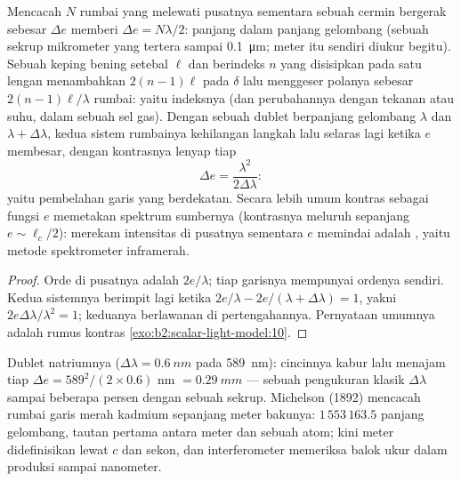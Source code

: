 \begin{proposition}\label{prop:b2:michelson:measure}
Mencacah $N$ rumbai yang melewati pusatnya sementara sebuah cermin bergerak sebesar $\Delta e$
memberi $\Delta e = N\lambda/2$: panjang dalam panjang gelombang (sebuah sekrup mikrometer
yang tertera sampai \qty{0.1}{\micro m}; meter itu sendiri diukur begitu). Sebuah
keping bening setebal $\ell$ dan berindeks $n$ yang disisipkan pada satu lengan
menambahkan $2(n - 1)\ell$ pada $\delta$ lalu menggeser polanya sebesar $2(n - 1)\ell/\lambda$
rumbai: yaitu indeksnya (dan perubahannya dengan tekanan atau suhu,
dalam sebuah sel gas). Dengan sebuah dublet berpanjang gelombang $\lambda$ dan $\lambda + \Delta\lambda$, kedua
sistem rumbainya kehilangan langkah lalu selaras lagi ketika $e$ membesar, dengan
kontrasnya lenyap tiap
\[
\Delta e = \frac{\lambda^2}{2\Delta\lambda} :
\]
yaitu pembelahan garis yang berdekatan. Secara lebih umum kontras sebagai
fungsi $e$ memetakan spektrum sumbernya (kontrasnya
meluruh sepanjang $e \sim \ell_c/2$): merekam intensitas di pusatnya sementara
$e$ memindai adalah \emph{}, yaitu metode
spektrometer inframerah.
\end{proposition}

\begin{proof}
Orde di pusatnya adalah $2e/\lambda$; tiap garisnya mempunyai ordenya sendiri. Kedua
sistemnya berimpit lagi ketika $2e/\lambda - 2e/(\lambda + \Delta\lambda) = 1$, yakni $2e\Delta\lambda
/\lambda^2 = 1$; keduanya berlawanan di pertengahannya. Pernyataan umumnya adalah
rumus kontras \cref{exo:b2:scalar-light-model:10}.
\end{proof}

\begin{example}\label{ex:b2:michelson:sodium}
Dublet natriumnya ($\Delta\lambda = \qty{0.6}{nm}$ pada \qty{589}{nm}): cincinnya kabur lalu
menajam tiap $\Delta e = 589^2/(2 \times 0.6)$ nm $= \qty{0.29}{mm}$ --- sebuah pengukuran
klasik $\Delta\lambda$ sampai beberapa persen dengan sebuah sekrup. Michelson (1892)
mencacah rumbai garis merah kadmium sepanjang meter
bakunya: $1\,553\,163.5$ panjang gelombang, tautan pertama antara
meter dan sebuah atom; kini meter didefinisikan lewat $c$ dan
sekon, dan interferometer memeriksa balok ukur dalam produksi sampai
nanometer.
\end{example}

